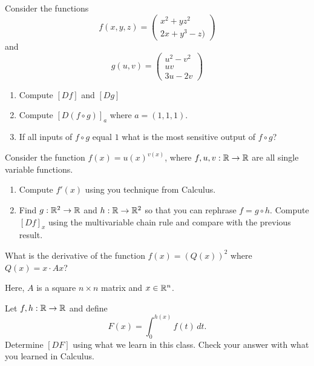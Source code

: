\documentclass[12pt]{amsart}
\begin{document}
\begin{question}
    Consider the functions
    $$ f(x,y,z) = \begin{pmatrix}
        x^2 + yz^2 \\ 2x + y^3 - z)
    \end{pmatrix} $$
    and
    \begin{equation*}
        g(u,v) = 
        \begin{pmatrix}
            u^2 - v^2 \\ uv \\ 3u - 2v
        \end{pmatrix}
    \end{equation*}

    \begin{enumerate}
        \item Compute $[Df]$ and $[Dg]$
        \item Compute $[D (f\circ g)]_a$ where $a = (1,1,1)$.
        \item If all inputs of $f\circ g$ equal $1$  
            what is the most sensitive output of $f\circ g$?
    \end{enumerate}
\end{question}

\begin{question}
    Consider the function $f(x) = u(x)^{v(x)}$, where $f, u, v: \mathbb{R} \to \mathbb{R}$ are all
    single variable functions.
    \begin{enumerate}
        \item Compute $f'(x)$ using you technique from Calculus.
        \item Find $g: \mathbb{R}^2 \to \mathbb{R}$ and $h:\mathbb{R} \to \mathbb{R}^2$ so that you 
            can rephrase $f = g\circ h$.
            Compute $[Df]_x$ using the multivariable chain rule and compare with the previous result.
    \end{enumerate}
\end{question}


\begin{question}
    What is the derivative of the function $f(x) = (Q(x))^2$ where
    $Q(x) = x\cdot A x $?

    Here, $A$ is a square $n\times n$  matrix and $x \in \mathbb{R}^n$.
\end{question}

\begin{question}
    Let $f, h:\mathbb{R} \to \mathbb{R}$ and define
    $$F(x) = \int_0^{h(x)} f(t) \, dt. $$
    Determine $[DF]$ using what we learn in this class.
    Check your answer with what you learned in Calculus.
\end{question}
\end{document}
